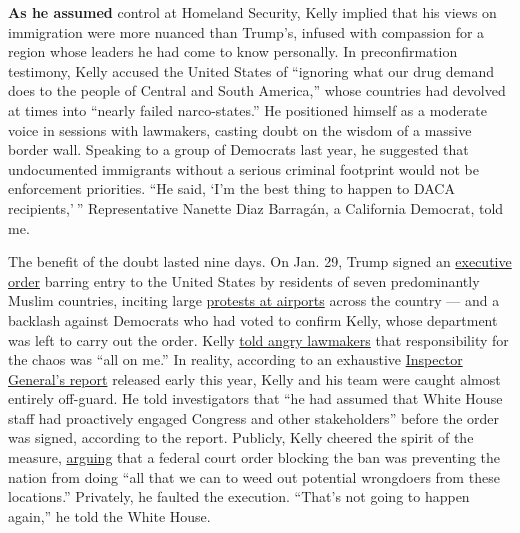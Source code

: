 \textbf{As he assumed} control at Homeland Security, Kelly implied that
his views on immigration were more nuanced than Trump's, infused with
compassion for a region whose leaders he had come to know personally. In
preconfirmation testimony, Kelly accused the United States of ``ignoring
what our drug demand does to the people of Central and South America,''
whose countries had devolved at times into ``nearly failed
narco-states.'' He positioned himself as a moderate voice in sessions
with lawmakers, casting doubt on the wisdom of a massive border wall.
Speaking to a group of Democrats last year, he suggested that
undocumented immigrants without a serious criminal footprint would not
be enforcement priorities. ``He said, `I'm the best thing to happen to
DACA recipients,' '' Representative Nanette Diaz Barragán, a California
Democrat, told me.

The benefit of the doubt lasted nine days. On Jan. 29, Trump signed an
\href{https://www.nytimes3xbfgragh.onion/2017/01/29/us/politics/donald-trump-rush-immigration-order-chaos.html}{executive
order} barring entry to the United States by residents of seven
predominantly Muslim countries, inciting large
\href{https://www.nytimes3xbfgragh.onion/2017/01/30/magazine/the-chaos-at-kennedy-airport-and-the-chaos-to-come.html}{protests
at airports} across the country --- and a backlash against Democrats who
had voted to confirm Kelly, whose department was left to carry out the
order. Kelly
\href{https://www.washingtonpost.com/world/national-security/in-their-courtrooms-theyre-protected-by-people-like-me-dhs-secretary-weighs-in-on-legal-dispute-over-trump-ban/2017/02/07/5e37fc4e-ed4e-11e6-9662-6eedf1627882_story.html}{told
angry lawmakers} that responsibility for the chaos was ``all on me.'' In
reality, according to an exhaustive
\href{https://www.oig.dhs.gov/sites/default/files/assets/2018-01/OIG-18-37-Jan18.pdf}{Inspector
General's report} released early this year, Kelly and his team were
caught almost entirely off-guard. He told investigators that ``he had
assumed that White House staff had proactively engaged Congress and
other stakeholders'' before the order was signed, according to the
report. Publicly, Kelly cheered the spirit of the measure,
\href{https://www.nytimes3xbfgragh.onion/2017/06/11/us/politics/as-trump-sounds-urgent-note-on-travel-ban-a-vetting-revamp-grinds-on.html}{arguing}
that a federal court order blocking the ban was preventing the nation
from doing ``all that we can to weed out potential wrongdoers from these
locations.'' Privately, he faulted the execution. ``That's not going to
happen again,'' he told the White House.

